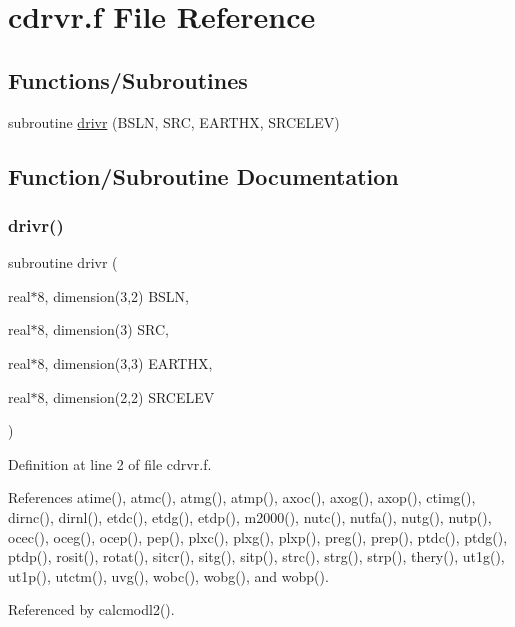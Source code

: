 \hypertarget{cdrvr_8f}{}\section{cdrvr.\+f File Reference}
\label{cdrvr_8f}
\subsection*{Functions/\+Subroutines}
\begin{DoxyCompactItemize}
\item 
subroutine \hyperlink{cdrvr_8f_a9c95ca2650cc35db9894366f93d0308b}{drivr} (B\+S\+LN, S\+RC, E\+A\+R\+T\+HX, S\+R\+C\+E\+L\+EV)
\end{DoxyCompactItemize}


\subsection{Function/\+Subroutine Documentation}
\mbox{\label{cdrvr_8f_a9c95ca2650cc35db9894366f93d0308b}} 
\subsubsection{\texorpdfstring{drivr()}{drivr()}}
{\footnotesize\ttfamily subroutine drivr (\begin{DoxyParamCaption}\item[{real$\ast$8, dimension(3,2)}]{B\+S\+LN,  }\item[{real$\ast$8, dimension(3)}]{S\+RC,  }\item[{real$\ast$8, dimension(3,3)}]{E\+A\+R\+T\+HX,  }\item[{real$\ast$8, dimension(2,2)}]{S\+R\+C\+E\+L\+EV }\end{DoxyParamCaption})}



Definition at line 2 of file cdrvr.\+f.



References atime(), atmc(), atmg(), atmp(), axoc(), axog(), axop(), ctimg(), dirnc(), dirnl(), etdc(), etdg(), etdp(), m2000(), nutc(), nutfa(), nutg(), nutp(), ocec(), oceg(), ocep(), pep(), plxc(), plxg(), plxp(), preg(), prep(), ptdc(), ptdg(), ptdp(), rosit(), rotat(), sitcr(), sitg(), sitp(), strc(), strg(), strp(), thery(), ut1g(), ut1p(), utctm(), uvg(), wobc(), wobg(), and wobp().



Referenced by calcmodl2().

